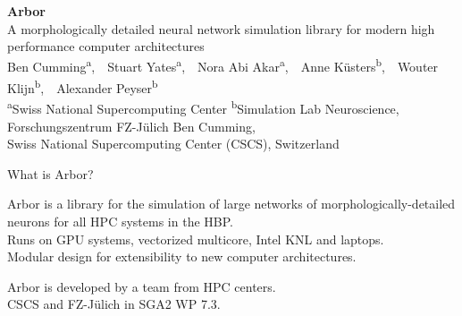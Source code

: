 \documentclass[a0paper,portrait]{baposter}
\newcommand{\arborname}{Arbor\xspace}
\newcommand{\arbor}{{\textcolor{blue!30!black}{\arborname}}\xspace}
\newcommand{\julich}{FZ-J\"ulich\xspace}
\newcommand{\newemph}[1]{{\color{emph}#1}}
\begin{document}
\begin{poster}
{
  \vspace{0.3\headerheight}
}
{ \Huge
  \textbf{\arbor} \\[0.1\baselineskip]
\large 
  A morphologically detailed neural network simulation library for modern high performance computer architectures \\[0.2\baselineskip]
  \small
    Ben Cumming\textsuperscript{a}\!\!,~~Stuart Yates\textsuperscript{a}\!\!,~~Nora Abi Akar\textsuperscript{a}\!\!,~~Anne K\"usters\textsuperscript{b}\!\!,~~Wouter Klijn\textsuperscript{b}\!\!,~~Alexander Peyser\textsuperscript{b}\\
    \textsuperscript{a}Swiss National Supercomputing Center \hspace{2mm}\textsuperscript{b}Simulation Lab Neuroscience, Forschungszentrum \julich
}
{\small
    \vspace{1em} Ben Cumming, \\[0.5em]
    Swiss National Supercomputing Center (CSCS), Switzerland\\
}


\begin{posterbox}[name=motivation,column=0,row=0,span=2]{What is \arbor?}
    \begin{center}\large
        \colorbox{yellow!20}{\arbor is a library for the simulation of large networks of morphologically-detailed}
        \\
        \colorbox{yellow!20}{neurons for all HPC systems in the HBP.}
        \\
        Runs on GPU systems, vectorized multicore, Intel KNL and laptops. \\
        Modular design for extensibility to new computer architectures.
    \end{center}

    \begin{center}
        \colorbox{yellow!20}{\large \arbor is developed by a team from HPC centers.}
        \\[2pt]
            \centering CSCS and \julich in SGA2 \newemph{WP 7.3}.
    \end{center}
\end{posterbox}


\end{poster}
\end{document}

